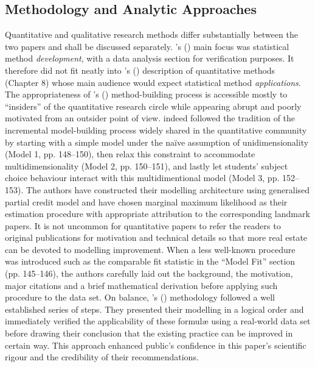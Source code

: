 \documentclass[
    a4paper,            %
    12pt,               %
    stu,                %
    noextraspace,       %
    floatsintext,       %
    biblatex,           %
    colorlinks=true,        %
    linkcolor=red,          %
    anchorcolor=black,      %
    citecolor=blue,         %
    urlcolor=blue,          %
    bookmarks=true,         %
    bookmarksopen=false,    %
    bookmarksnumbered=true  %
    margin=2cm              %
]{apa7}
\newcommand{\poscite}[1]{\citeauthor{#1}'s (\citeyear{#1})}
\begin{document}
\subsection{Methodology and Analytic Approaches}

Quantitative and qualitative research methods differ substantially between the two papers and shall be discussed separately. \poscite{korobko:2008} main focus was statistical method \emph{development}, with a data analysis section for verification purposes. It therefore did not fit neatly into \poscite{creswell:2018} description of quantitative methods (Chapter 8) whose main audience would expect statistical method \emph{applications}. The appropriateness of \poscite{korobko:2008} method-building process is accessible mostly to ``insiders'' of the quantitative research circle while appearing abrupt and poorly motivated from an outsider point of view. \textcite{korobko:2008} indeed followed the tradition of the incremental model-building process widely shared in the quantitative community by starting with a simple model under the na{\"i}ve assumption of unidimensionality (Model 1, pp. 148--150), then relax this constraint to accommodate multidimensionality (Model 2, pp. 150--151), and lastly let students' subject choice behaviour interact with this multidimentional model (Model 3, pp. 152--153). The authors have constructed their modelling architecture using generalised partial credit model \parencite[GPCM,][]{muraki:1992} and have chosen marginal maximum likelihood \parencite[MML,][]{bock:1981} as their estimation procedure with appropriate attribution to the corresponding landmark papers. It is not uncommon for quantitative papers to refer the readers to original publications for motivation and technical details so that more real estate can be devoted to modelling improvement. When a less well-known procedure was introduced such as the comparable fit statistic in the ``Model Fit'' section (pp. 145--146), the authors carefully laid out the background, the motivation, major citations and a brief mathematical derivation before applying such procedure to the data set. On balance, \poscite{korobko:2008} methodology followed a well established series of steps. They presented their modelling in a logical order and immediately verified the applicability of these formul{\ae} using a real-world data set before drawing their conclusion that the existing practice can be improved in certain way. This approach enhanced public's confidence in this paper's scientific rigour and the credibility of their recommendations.
\end{document}
